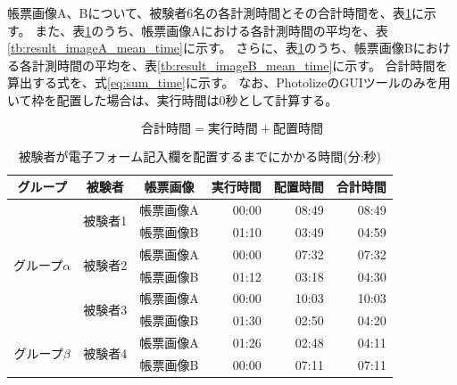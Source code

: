 帳票画像A、Bについて、被験者6名の各計測時間とその合計時間を、表\ref{tb:result_time}に示す。
また、表\ref{tb:result_time}のうち、帳票画像Aにおける各計測時間の平均を、表\ref{tb:result_imageA_mean_time}に示す。
さらに、表\ref{tb:result_time}のうち、帳票画像Bにおける各計測時間の平均を、表\ref{tb:result_imageB_mean_time}に示す。
合計時間を算出する式を、式\ref{eq:sum_time}に示す。
なお、PhotolizeのGUIツールのみを用いて枠を配置した場合は、実行時間は0秒として計算する。

\begin{equation}\label{eq:sum_time}
    合計時間=実行時間+配置時間
\end{equation}

\begin{table}[t]
    \caption{被験者が電子フォーム記入欄を配置するまでにかかる時間(分:秒)}
	\label{tb:result_time}
    \centering
    \begin{tabular}{ccc||rrr} 
    グループ & 被験者 & 帳票画像 & 実行時間 & 配置時間 & 合計時間 \\
    \hline \hline
    
    \multirow{6}{*}{グループ$\alpha$} & \multirow{2}{*}{被験者1} & 帳票画像A & 00:00 & 08:49 & 08:49 \\ %
                                                            & & 帳票画像B & 01:10 & 03:49 & 04:59 \\ 
                                                            
                                    & \multirow{2}{*}{被験者2} & 帳票画像A & 00:00 & 07:32 & 07:32 \\ %
                                                            & & 帳票画像B & 01:12 & 03:18 & 04:30 \\
                                                            
                                    & \multirow{2}{*}{被験者3} & 帳票画像A & 00:00 & 10:03 & 10:03 \\ %
                                                            & & 帳票画像B & 01:30 & 02:50 & 04:20 \\
                                                            \hline
    \multirow{6}{*}{グループ$\beta$} & \multirow{2}{*}{被験者4} & 帳票画像A & 01:26 & 02:48 & 04:11 \\ %
                                                            & & 帳票画像B & 00:00 & 07:11 & 07:11 \\
                                                            

\end{tabular}
\end{table}
